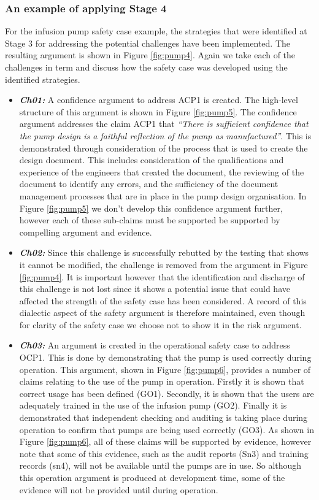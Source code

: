 \subsubsection{An example of applying Stage 4}

For the infusion pump safety case example, the strategies that were identified at Stage 3 for addressing the potential challenges have been implemented. The resulting argument is shown in Figure \ref{fig:pump4}. Again we take each of the challenges in term and discuss how the safety case was developed using the identified strategies.

\begin{itemize}
    \item \textbf{\textit{Ch01:}} A confidence argument to address ACP1 is created. The high-level structure of this argument is shown in Figure \ref{fig:pump5}. The confidence argument addresses the claim ACP1 that \textit{``There is sufficient confidence that the pump design is a faithful reflection of the pump as manufactured''}.  This is demonstrated through consideration of the process that is used to create the design document. This includes consideration of the qualifications and experience of the engineers that created the document, the reviewing of the document to identify any errors, and the sufficiency of the document management processes that are in place in the pump design organisation. In Figure \ref{fig:pump5} we don't develop this confidence argument further, however each of these sub-claims must be supported be supported by compelling argument and evidence.
    \item \textbf{\textit{Ch02:}} Since this challenge is successfully rebutted by the testing that shows it cannot be modified, the challenge is removed from the argument in Figure \ref{fig:pump4}. It is important however that the identification and discharge of this challenge is not lost since it shows a potential issue that could have affected the strength of the safety case has been considered. A record of this dialectic aspect of the safety argument is therefore maintained, even though for clarity of the safety case we choose not to show it in the risk argument.
    \item \textbf{\textit{Ch03:}} An argument is created in the operational safety case to address OCP1. This is done by demonstrating that the pump is used correctly during operation. This argument, shown in Figure \ref{fig:pump6}, provides a number of claims relating to the use of the pump in operation. Firstly it is shown that correct usage has been defined (GO1). Secondly, it is shown that the users are adequately trained in the use of the infusion pump (GO2). Finally it is demonstrated that independent checking and auditing is taking place during operation to confirm that pumps are being used correctly (GO3). As shown in Figure \ref{fig:pump6}, all of these claims will be supported by evidence, however note that some of this evidence, such as the audit reports (Sn3) and training records (sn4), will not be available until the pumps are in use. So although this operation argument is produced at development time, some of the evidence will not be provided until during operation.

\end{itemize}

